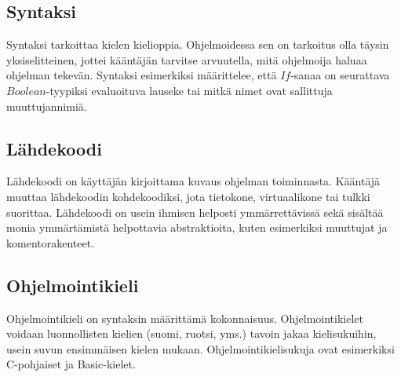 \subsection{Syntaksi}
Syntaksi tarkoittaa kielen kielioppia.
Ohjelmoidessa sen on tarkoitus olla täysin yksiselitteinen,
jottei kääntäjän tarvitse arvuutella,
mitä ohjelmoija haluaa ohjelman tekevän.
Syntaksi esimerkiksi määrittelee,
että $If$-sanaa on seurattava $Boolean$-tyypiksi evaluoituva lauseke
tai mitkä nimet ovat sallittuja muuttujannimiä.

\subsection{Lähdekoodi}
Lähdekoodi on käyttäjän kirjoittama kuvaus ohjelman toiminnasta.
Kääntäjä muuttaa lähdekoodin kohdekoodiksi,
jota tietokone, virtuaalikone tai tulkki suorittaa.
Lähdekoodi on usein ihmisen helposti ymmärrettävissä
sekä sisältää monia ymmärtämistä helpottavia abstraktioita,
kuten esimerkiksi muuttujat ja komentorakenteet.

\subsection{Ohjelmointikieli}
Ohjelmointikieli on syntaksin määrittämä kokonnaisuus.
Ohjelmointikielet voidaan luonnollisten kielien
(suomi, ruotsi, yms.)
tavoin jakaa kielisukuihin,
usein suvun ensimmäisen kielen mukaan.
Ohjelmointikielisukuja ovat esimerkiksi
C-pohjaiset ja
Basic-kielet.
